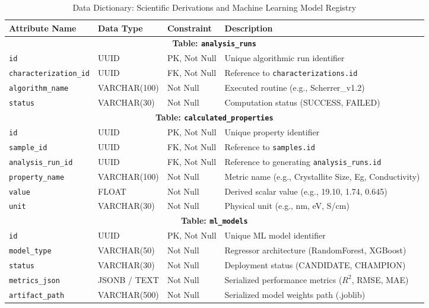 \documentclass[12pt,a4paper,oneside]{report}
\begin{document}
{{{\begin{table}[!htbp]
\centering
\footnotesize
\setlength{\tabcolsep}{4pt}
\renewcommand{\arraystretch}{1.2}
\caption{Data Dictionary: Scientific Derivations and Machine Learning Model Registry}
\label{tab:dd_analytics}
\begin{tabular}{|p{3.7cm}|p{2.7cm}|p{2.5cm}|p{5.4cm}|}
\hline
\textbf{Attribute Name} & \textbf{Data Type} & \textbf{Constraint} & \textbf{Description} \\
\hline
\hline
\multicolumn{4}{|c|}{\textbf{Table: \texttt{analysis\_runs}}} \\
\hline
\texttt{id} & UUID & PK, Not Null & Unique algorithmic run identifier \\
\texttt{characterization\_id} & UUID & FK, Not Null & Reference to \texttt{characterizations.id} \\
\texttt{algorithm\_name} & VARCHAR(100) & Not Null & Executed routine (e.g., Scherrer\_v1.2) \\
\texttt{status} & VARCHAR(30) & Not Null & Computation status (SUCCESS, FAILED) \\
\hline
\hline
\multicolumn{4}{|c|}{\textbf{Table: \texttt{calculated\_properties}}} \\
\hline
\texttt{id} & UUID & PK, Not Null & Unique property identifier \\
\texttt{sample\_id} & UUID & FK, Not Null & Reference to \texttt{samples.id} \\
\texttt{analysis\_run\_id} & UUID & FK, Not Null & Reference to generating \texttt{analysis\_runs.id} \\
\texttt{property\_name} & VARCHAR(100) & Not Null & Metric name (e.g., Crystallite Size, Eg, Conductivity) \\
\texttt{value} & FLOAT & Not Null & Derived scalar value (e.g., 19.10, 1.74, 0.645) \\
\texttt{unit} & VARCHAR(30) & Not Null & Physical unit (e.g., nm, eV, S/cm) \\
\hline
\hline
\multicolumn{4}{|c|}{\textbf{Table: \texttt{ml\_models}}} \\
\hline
\texttt{id} & UUID & PK, Not Null & Unique ML model identifier \\
\texttt{model\_type} & VARCHAR(50) & Not Null & Regressor architecture (RandomForest, XGBoost) \\
\texttt{status} & VARCHAR(30) & Not Null & Deployment status (CANDIDATE, CHAMPION) \\
\texttt{metrics\_json} & JSONB / TEXT & Not Null & Serialized performance metrics ($R^2$, RMSE, MAE) \\
\texttt{artifact\_path} & VARCHAR(500) & Not Null & Serialized model weights path (.joblib) \\
\hline
\end{tabular}
\end{table}





}}}
\end{document}
